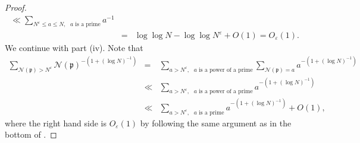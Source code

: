 \documentclass[11pt]{amsart}
\theoremstyle{definition}
\newcommand{\NN}{{\mathcal N}}
\newcommand{\mf}{\mathfrak}
\begin{document}
\begin{proof}
\begin{eqnarray*}
 \ll \sum_{N^{\varepsilon}\leq a\leq N, \text{ $a$ is a prime}}a^{-1}
 \\& = &\log\log N-\log\log N^{\varepsilon}+O(1)=O_{\varepsilon}(1).
\end{eqnarray*}    
We continue with part (iv). Note that
\begin{eqnarray*}
    \sum_{\NN(\mf p)>N^{\varepsilon}}\NN(\mf p)^{-(1+(\log N)^{-1})}
   & = &\sum_{a>N^{\varepsilon}, \text{ $a$ is a power of a prime}}\sum_{\NN(\mf p)=a}a^{-(1+(\log N)^{-1})}
   \\&\ll & \sum_{a>N^{\varepsilon}, \text{ $a$ is a power of a prime}}a^{-(1+(\log N)^{-1})}\\
 &  \ll & \sum_{a>N^{\varepsilon}, \text{ $a$ is a  prime}}a^{-(1+(\log N)^{-1})}+O(1),
\end{eqnarray*}  
where the right hand side is $O_{\varepsilon}(1)$ by following the same argument as in the bottom of \cite[p. 246]{E79book}.


\end{proof}
\end{document}
